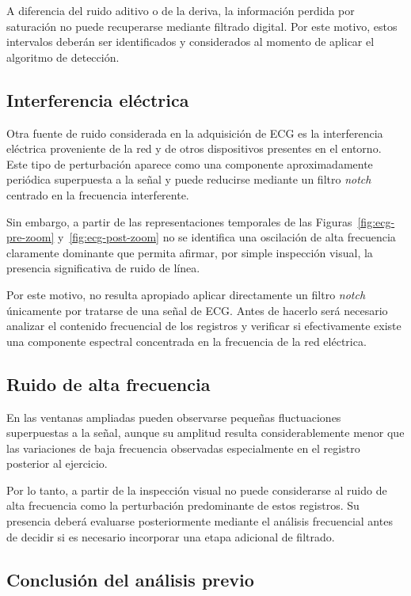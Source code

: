 \documentclass[12pt,a4paper]{article}
\begin{document}
A diferencia del ruido aditivo o de la deriva, la información perdida por
saturación no puede recuperarse mediante filtrado digital. Por este motivo,
estos intervalos deberán ser identificados y considerados al momento de aplicar
el algoritmo de detección.

\subsection{Interferencia eléctrica}

Otra fuente de ruido considerada en la adquisición de ECG es la interferencia
eléctrica proveniente de la red y de otros dispositivos presentes en el entorno.
Este tipo de perturbación aparece como una componente aproximadamente periódica
superpuesta a la señal y puede reducirse mediante un filtro
\textit{notch} centrado en la frecuencia interferente.

Sin embargo, a partir de las representaciones temporales de las
Figuras~\ref{fig:ecg-pre-zoom} y~\ref{fig:ecg-post-zoom} no se identifica una
oscilación de alta frecuencia claramente dominante que permita afirmar, por
simple inspección visual, la presencia significativa de ruido de línea.

Por este motivo, no resulta apropiado aplicar directamente un filtro
\textit{notch} únicamente por tratarse de una señal de ECG. Antes de hacerlo
será necesario analizar el contenido frecuencial de los registros y verificar
si efectivamente existe una componente espectral concentrada en la frecuencia
de la red eléctrica.

\subsection{Ruido de alta frecuencia}

En las ventanas ampliadas pueden observarse pequeñas fluctuaciones superpuestas
a la señal, aunque su amplitud resulta considerablemente menor que las
variaciones de baja frecuencia observadas especialmente en el registro
posterior al ejercicio.

Por lo tanto, a partir de la inspección visual no puede considerarse al ruido
de alta frecuencia como la perturbación predominante de estos registros. Su
presencia deberá evaluarse posteriormente mediante el análisis frecuencial antes
de decidir si es necesario incorporar una etapa adicional de filtrado.

\subsection{Conclusión del análisis previo}
\end{document}
